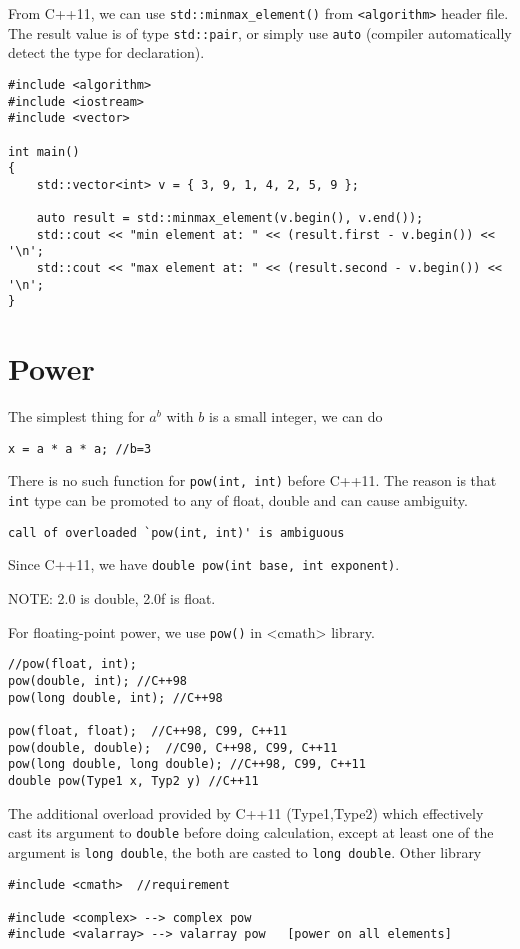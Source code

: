 From C++11, we can use \verb!std::minmax_element()! from \verb!<algorithm>!
header file. The result value is of type \verb!std::pair!, or simply use
\verb!auto! (compiler automatically detect the type for declaration).

\begin{Verbatim}
#include <algorithm>
#include <iostream>
#include <vector>
 
int main()
{
    std::vector<int> v = { 3, 9, 1, 4, 2, 5, 9 };
 
    auto result = std::minmax_element(v.begin(), v.end());
    std::cout << "min element at: " << (result.first - v.begin()) << '\n';
    std::cout << "max element at: " << (result.second - v.begin()) << '\n';
}
\end{Verbatim}


\section{Power}

The simplest thing for $a^b$ with $b$ is a small integer, we can do
\begin{verbatim}
x = a * a * a; //b=3
\end{verbatim}
There  is no such function for \verb!pow(int, int)! before C++11. The reason is
that \verb!int! type can be promoted to any of float, double and can cause ambiguity.
\begin{verbatim}
call of overloaded `pow(int, int)' is ambiguous
\end{verbatim}
Since C++11, we have \verb!double pow(int base, int exponent)!.


\begin{framed}
NOTE: 2.0 is double, 2.0f is float.
\end{framed}

For floating-point power, we use \verb!pow()! in <cmath> library.
\begin{verbatim}
//pow(float, int);
pow(double, int); //C++98
pow(long double, int); //C++98

pow(float, float);  //C++98, C99, C++11
pow(double, double);  //C90, C++98, C99, C++11
pow(long double, long double); //C++98, C99, C++11
double pow(Type1 x, Typ2 y) //C++11 
\end{verbatim}
The additional overload provided by C++11 (Type1,Type2) which effectively cast
its argument to \verb!double! before doing calculation, except at least one of
the argument is \verb!long double!, the both are casted to \verb!long double!.
Other library
\begin{verbatim}
#include <cmath>  //requirement

#include <complex> --> complex pow      
#include <valarray> --> valarray pow   [power on all elements]
\end{verbatim}

